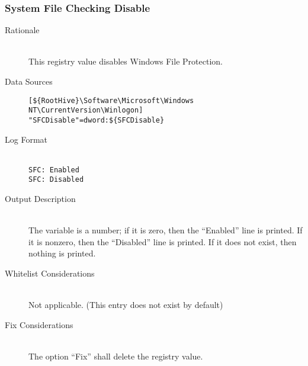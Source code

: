 \subsubsection{System File Checking Disable}
\begin{description}
\item[Rationale] \hfill \\
This registry value disables Windows File Protection.
\item[Data Sources] \hfill
\vspace{-\baselineskip}
\begin{verbatim}
[${RootHive}\Software\Microsoft\Windows NT\CurrentVersion\Winlogon]
"SFCDisable"=dword:${SFCDisable}
\end{verbatim}
\item[Log Format] \hfill \\
\verb|SFC: Enabled| \\
\verb|SFC: Disabled|
\item[Output Description] \hfill \\
The variable  is a number; if it is zero, then the ``Enabled''
line is printed. If it is nonzero, then the ``Disabled'' line is printed. If it
does not exist, then nothing is printed.
\item[Whitelist Considerations] \hfill \\
Not applicable. (This entry does not exist by default)
\item[Fix Considerations] \hfill \\
The option ``Fix'' shall delete the registry value.
\end{description}

